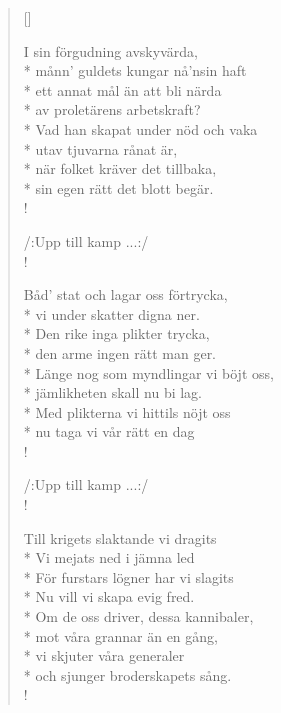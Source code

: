\begin{verse}[\versewidth]

I sin förgudning avskyvärda,\\*
månn’ guldets kungar nå’nsin haft\\*
ett annat mål än att bli närda\\*
av proletärens arbetskraft?\\*
Vad han skapat under nöd och vaka\\*
utav tjuvarna rånat är,\\*
när folket kräver det tillbaka,\\*
sin egen rätt det blott begär.\\!


/:Upp till kamp ...:/\\!


Båd’ stat och lagar oss förtrycka,\\*
vi under skatter digna ner.\\*
Den rike inga plikter trycka,\\*
den arme ingen rätt man ger.\\*
Länge nog som myndlingar vi böjt oss,\\*
jämlikheten skall nu bi lag.\\*
Med plikterna vi hittils nöjt oss\\*
nu taga vi vår rätt en dag\\!


/:Upp till kamp ...:/\\!


Till krigets slaktande vi dragits\\*
Vi mejats ned i jämna led\\*
För furstars lögner har vi slagits\\*
Nu vill vi skapa evig fred.\\*
Om de oss driver, dessa kannibaler,\\*
mot våra grannar än en gång,\\*
vi skjuter våra generaler\\*
och sjunger broderskapets sång.\\! 


\end{verse}
